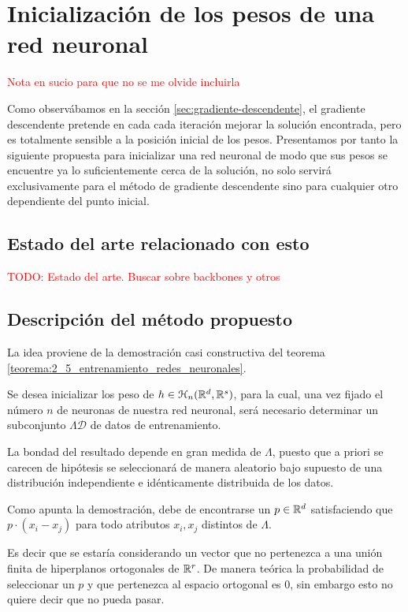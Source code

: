 
\section{ Inicialización de los pesos de una red neuronal}  

\textcolor{red}{Nota en sucio para que no se me olvide incluirla}  

Como observábamos en la sección \ref{sec:gradiente-descendente}, el gradiente descendente pretende en cada 
cada iteración mejorar la solución encontrada, pero es 
totalmente sensible a la posición inicial 
de los pesos. 
Presentamos por tanto la siguiente propuesta para inicializar una red neuronal de modo que sus pesos se encuentre ya lo suficientemente cerca de la solución, 
no solo servirá exclusivamente para el método de gradiente descendente 
sino para cualquier otro dependiente del punto inicial. 

\subsection{ Estado del arte relacionado con esto} 

\textcolor{red}{TODO: Estado del arte. Buscar sobre backbones y otros}

\subsection{Descripción del método propuesto}

La idea proviene de la demostración casi constructiva del teorema \ref{teorema:2_5_entrenamiento_redes_neuronales}.

Se desea inicializar los peso de $h \in \mathcal{H}_n(\mathbb{R}^d,\mathbb{R}^s)$, para la cual, una vez fijado el número $n$ de neuronas de nuestra red neuronal, será necesario  determinar un subconjunto $\Lambda \mathcal{D}$ de datos de entrenamiento. 

La bondad del resultado depende en gran medida de $\Lambda$, 
puesto que a priori se carecen de hipótesis se seleccionará 
de manera aleatorio bajo supuesto de una distribución 
independiente e idénticamente distribuida de los datos. 

Como apunta la demostración, debe de encontrarse un 
$p \in \mathbb{R}^d$ satisfaciendo que $p \cdot (x_i-x_j)$ para todo
atributos $x_i,x_j$ distintos de $\Lambda$.  

Es decir que se estaría considerando un vector que no 
pertenezca a una unión finita de hiperplanos ortogonales de $\mathbb{R}^r$. 
De manera teórica la probabilidad de seleccionar un $p$ y 
que pertenezca al espacio ortogonal es $0$, sin embargo esto 
no quiere decir que no pueda pasar. 

